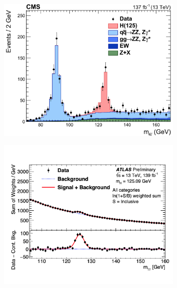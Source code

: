 \begin{figure}[ht]
        \centering
        \begin{subfigure}[b]{0.475\textwidth}
            \centering
            \includegraphics[width=\textwidth]{MSc_Thesis/fig/cms-higgs-13tev.png}
        \end{subfigure}
        \hspace{0.2cm}
        \begin{subfigure}[b]{0.475\textwidth}  
            \centering 
            \includegraphics[width=\textwidth]{MSc_Thesis/fig/atlas-higgs-13tev.png}

\end{subfigure}
\end{figure}
